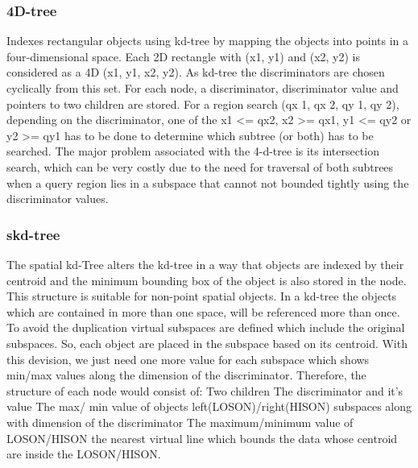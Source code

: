 \documentclass[a4paper,12pt]{article}
\begin{document}
\subsubsection{4D-tree}
Indexes rectangular objects using kd-tree by mapping the objects into points in a four-dimensional space. Each 2D rectangle with (x1, y1) and (x2, y2) is considered as a 4D (x1, y1, x2, y2). As kd-tree the discriminators are chosen cyclically from this set. For each node, a discriminator, discriminator value and pointers to two children are stored. 
For a region search (qx 1, qx 2, qy 1, qy 2), depending on the discriminator, one of the x1 <= qx2, x2  >=  qx1, y1 <= qy2 or y2 >= qy1 has to be done to determine which subtree (or both) has to be searched.
The major problem associated with the 4-d-tree is its intersection search, which can be very costly due to the need for traversal of both subtrees when a query region lies in a subspace that cannot not bounded tightly using the discriminator values.

\subsubsection{skd-tree}
The spatial kd-Tree alters the kd-tree in a way that objects are indexed by their centroid and the minimum bounding box of the object is also stored in the node. This structure is suitable for non-point spatial objects. In a kd-tree the objects which are contained in more than one space, will be referenced more than once. To avoid the duplication virtual subspaces are defined which include the original subspaces. So, each object are placed in the subspace based on its centroid.
With this devision, we just need one more value for each subspace which shows min/max values along the dimension of the discriminator. Therefore, the structure of each node would consist of:
Two children
The discriminator and it's value
The max/ min value of objects left(LOSON)/right(HISON) subspaces along with dimension of the discriminator
The maximum/minimum value of LOSON/HISON the nearest virtual line which bounds the data whose centroid are inside the LOSON/HISON.
\end{document}

